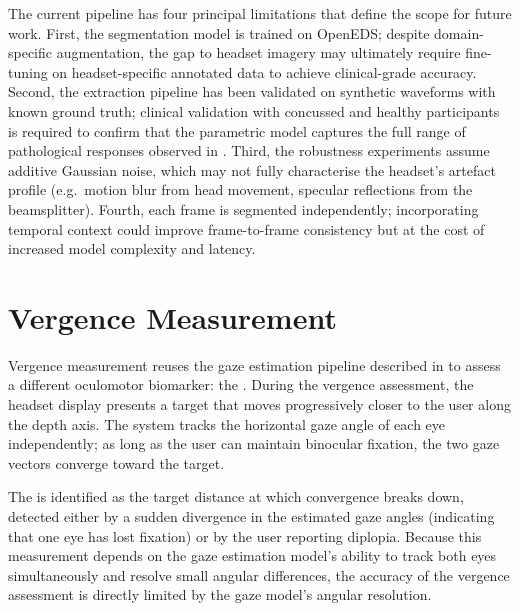 The current pipeline has four principal limitations that define the scope for future work. First, the segmentation model is trained on OpenEDS; despite domain-specific augmentation, the gap to headset imagery may ultimately require fine-tuning on headset-specific annotated data to achieve clinical-grade accuracy. Second, the  extraction pipeline has been validated on synthetic waveforms with known ground truth; clinical validation with concussed and healthy participants is required to confirm that the parametric model captures the full range of pathological  responses observed in . Third, the robustness experiments assume additive Gaussian noise, which may not fully characterise the headset's artefact profile (e.g.\ motion blur from head movement, specular reflections from the beamsplitter). Fourth, each frame is segmented independently; incorporating temporal context could improve frame-to-frame consistency but at the cost of increased model complexity and latency.


\section{Vergence Measurement}
\label{sec:vergence}

Vergence measurement reuses the gaze estimation pipeline described in  to assess a different oculomotor biomarker: the . During the vergence assessment, the headset display presents a target that moves progressively closer to the user along the depth axis. The system tracks the horizontal gaze angle of each eye independently; as long as the user can maintain binocular fixation, the two gaze vectors converge toward the target.

The  is identified as the target distance at which convergence breaks down, detected either by a sudden divergence in the estimated gaze angles (indicating that one eye has lost fixation) or by the user reporting diplopia. Because this measurement depends on the gaze estimation model's ability to track both eyes simultaneously and resolve small angular differences, the accuracy of the vergence assessment is directly limited by the gaze model's angular resolution. 

